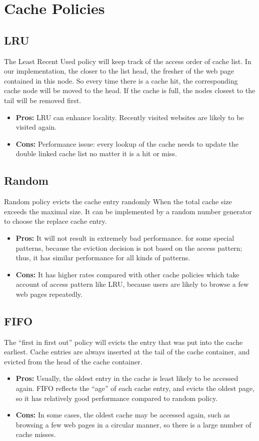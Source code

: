 \documentclass[paper=a4, fontsize=11pt]{scrartcl} %
\numberwithin{equation}{section} %
\numberwithin{figure}{section} %
\numberwithin{table}{section} %
\begin{document}
\section{Cache Policies}

\subsection{LRU}
The Least Recent Used policy will keep track of the access order 
of cache list. In our implementation, the closer to the list head, 
the fresher of the web page contained in this node. So every time 
there is a cache hit, the corresponding cache node will be moved to
the head. If the cache is full, the nodes closest to the tail will
be removed first.
\begin{itemize}
\item \textbf{Pros:} LRU can enhance locality. Recently visited websites
are likely to be visited again.
\item \textbf{Cons:} Performance issue: every lookup of the cache needs
to update the double linked cache list no matter it is a hit or
miss.
\end{itemize}

\subsection{Random}
Random policy evicts the cache entry randomly When the total cache 
size exceeds the maximal size. It can be implemented by a random
number generator to choose the replace cache entry.
\begin{itemize}
\item \textbf{Pros:} It will not result in extremely bad performance.
for some special
 patterns, because the eviction decision is not based on the 
access pattern; thus, it has similar performance for all kinds of patterns.
\item \textbf{Cons:} It has higher rates compared with other cache 
policies which take account of access pattern like LRU, because users
are likely to browse a few web pages repeatedly.
\end{itemize}

\subsection{FIFO}
The ``first in first out'' policy will evicts the entry that was put 
into the cache earliest. Cache entries are always inserted at the tail
of the cache container, and evicted from the head of the cache container.
\begin{itemize}
\item \textbf{Pros:} Usually, the oldest entry in the cache is least
likely to be accessed again. FIFO reflects the ``age'' of each cache entry, 
and evicts the oldest page, so it has relatively good performance compared
to random policy.
\item \textbf{Cons:} In some cases, the oldest cache may be accessed again,
such as browsing a few web pages in a circular manner, so there is a large 
number of cache misses. 
\end{itemize}
\end{document}
